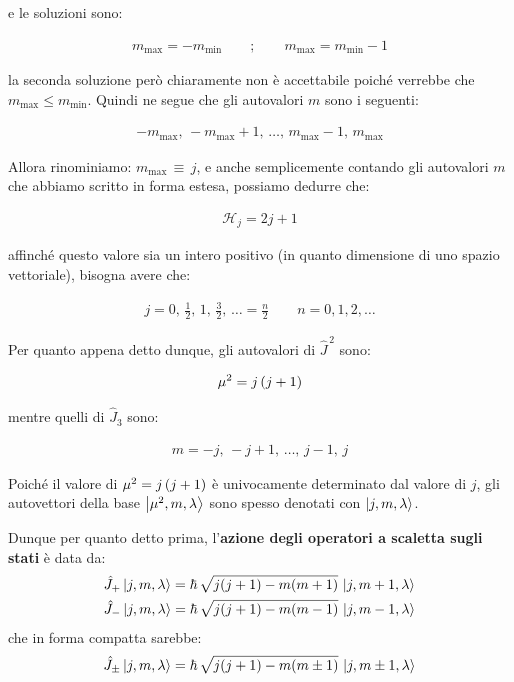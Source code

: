 	e le soluzioni sono:
	
\begin{align*}
	m_{\text{max}} = - m_{\text{min}} \qquad ; \qquad m_{\text{max}} = m_{\text{min}} - 1 
\end{align*}
	
	la seconda soluzione però chiaramente non è accettabile poiché verrebbe che $m_{\text{max}} \leq m_{\text{min}}$. Quindi ne segue che gli autovalori $m$ sono i seguenti:
	
\begin{align*}
	-m_{\text{max}}, \, -m_{\text{max}} +1,\, \ldots, \, m_{\text{max}} - 1,\, m_{\text{max}}
\end{align*}

	Allora rinominiamo: $m_{\text{max}} \, \equiv \, j$, e anche semplicemente contando gli autovalori $m$ che abbiamo scritto in forma estesa, possiamo dedurre che: 
	
\begin{align*}
	\mathcal{H}_j = 2j +1
\end{align*}
	
	 affinché questo valore sia un intero positivo (in quanto dimensione di uno spazio vettoriale), bisogna avere che:
	
\begin{align*}
	j = 0, \, \frac{1}{2}, \, 1, \, \frac{3}{2}, \, \ldots = \frac{n}{2} \qquad n = 0, 1, 2, \ldots
\end{align*}

	Per quanto appena detto dunque, gli autovalori di $\hat{J}^{\, 2}$ sono:
	
\begin{align*}
	\mu^2 = j \, \qty(j+1) 
\end{align*}

	mentre quelli di $\hat{J}_3$ sono:
	
\begin{align*}
	m = -j, \, -j +1, \, \ldots, \, j-1, \, j
\end{align*}

	Poiché il valore di $\mu^2 = j \, \qty( j + 1 )$ è univocamente determinato dal valore di $j$, gli autovettori della base $\ket{\mu^2, m, \lambda}$ sono spesso denotati con $\ket{j, m, \lambda}$. 
	
\begin{mydef}
	Dunque per quanto detto prima, l'\textbf{azione degli operatori a scaletta sugli stati} è data da:
\begin{align*}
	& \hat{J}_+ \ket{j, m, \lambda} = \hbar \, \sqrt{ j \qty(j+1) - m \qty(m+1) } \, \ket{j, m +1, \lambda} \\
	& \hat{J}_- \ket{j, m, \lambda} = \hbar \, \sqrt{ j \qty(j+1) - m \qty(m-1) } \, \ket{j, m -1, \lambda} 
\end{align*}
	che in forma compatta sarebbe:
\begin{align*}
	\hat{J}_{\pm} \ket{j, m, \lambda} = \hbar \, \sqrt{ j \qty(j+1) - m \qty(m \pm 1) } \, \ket{j, m \pm 1, \lambda}  
\end{align*}
\end{mydef}

